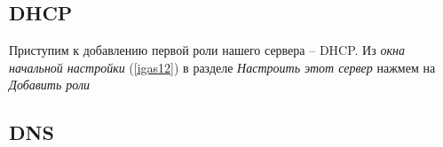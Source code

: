 \subsection{DHCP}
Приступим к добавлению первой роли нашего сервера -- DHCP. Из \textit{окна начальной настройки} (\ref{igas12}) в разделе \textit{Настроить этот сервер} нажмем на \textit{Добавить роли}
\subsection{DNS}